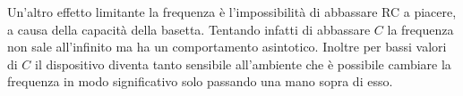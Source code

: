 \documentclass[10pt,a4paper]{article}
\begin{document}
Un'altro effetto limitante la frequenza è l'impossibilità di abbassare RC a piacere, a causa della capacità della basetta. Tentando infatti di abbassare $C$ la frequenza non sale all'infinito ma ha un comportamento asintotico. Inoltre per bassi valori di $C$ il dispositivo diventa tanto sensibile all'ambiente che è possibile cambiare la frequenza in modo significativo solo passando una mano sopra di esso.
\end{document}
